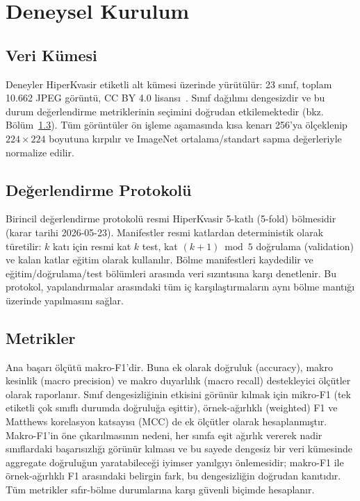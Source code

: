 \section{Deneysel Kurulum}
\label{sec:setup}

\subsection{Veri Kümesi}
\label{subsec:dataset}
Deneyler HiperKvasir etiketli alt kümesi üzerinde yürütülür: 23 sınıf, toplam
10.662 JPEG görüntü, CC BY 4.0 lisansı~\cite{borgli2020hyperkvasir}. Sınıf
dağılımı dengesizdir ve bu durum değerlendirme metriklerinin seçimini doğrudan
etkilemektedir (bkz. Bölüm~\ref{subsec:metrics}). Tüm görüntüler ön işleme
aşamasında kısa kenarı 256'ya ölçeklenip $224\times224$ boyutuna kırpılır ve
ImageNet ortalama/standart sapma değerleriyle normalize edilir.

\subsection{Değerlendirme Protokolü}
\label{subsec:protocol}
Birincil değerlendirme protokolü resmi HiperKvasir 5-katlı (5-fold) bölmesidir
(karar tarihi 2026-05-23). Manifestler resmi katlardan deterministik olarak
türetilir: $k$ katı için resmi kat $k$ test, kat $(k+1)\bmod 5$ doğrulama
(validation) ve kalan katlar eğitim olarak kullanılır. Bölme manifestleri
kaydedilir ve eğitim/doğrulama/test bölümleri arasında veri sızıntısına karşı
denetlenir. Bu protokol, yapılandırmalar arasındaki tüm iç
karşılaştırmaların aynı bölme mantığı üzerinde yapılmasını sağlar.

\subsection{Metrikler}
\label{subsec:metrics}
Ana başarı ölçütü makro-F1'dir. Buna ek olarak doğruluk (accuracy),
makro kesinlik (macro precision) ve makro duyarlılık (macro recall) destekleyici
ölçütler olarak raporlanır. Sınıf dengesizliğinin etkisini görünür kılmak için
mikro-F1 (tek etiketli çok sınıflı durumda doğruluğa eşittir), örnek-ağırlıklı
(weighted) F1 ve Matthews korelasyon katsayısı (MCC) de ek ölçütler olarak
hesaplanmıştır. Makro-F1'in öne çıkarılmasının nedeni, her sınıfa eşit ağırlık
vererek nadir sınıflardaki başarısızlığı görünür kılması ve bu sayede dengesiz
bir veri kümesinde aggregate doğruluğun yaratabileceği iyimser yanılgıyı
önlemesidir; makro-F1 ile örnek-ağırlıklı F1 arasındaki belirgin fark, bu
dengesizliğin doğrudan kanıtıdır. Tüm metrikler sıfır-bölme durumlarına karşı
güvenli biçimde hesaplanır.

